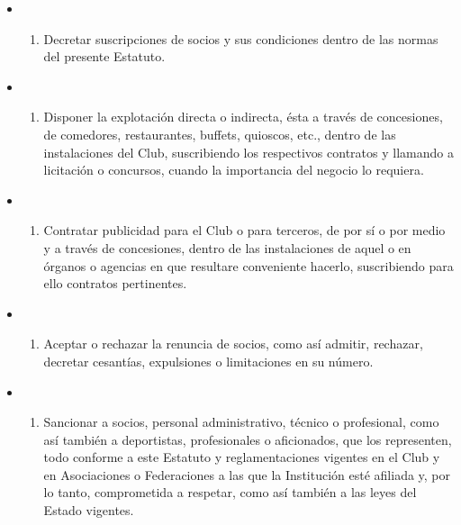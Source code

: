 \documentclass[]{book}
\providecommand{\tightlist}{%
  \setlength{\itemsep}{0pt}\setlength{\parskip}{0pt}}
\begin{document}
\begin{itemize}
\begin{itemize}
\begin{enumerate}
    \end{enumerate}
  \item
    \begin{enumerate}
    \def\labelenumi{\alph{enumi})}
    \setcounter{enumi}{14}
    \tightlist
    \item
      Decretar suscripciones de socios y sus condiciones dentro de las normas del presente Estatuto.
    \end{enumerate}
  \item
    \begin{enumerate}
    \def\labelenumi{\alph{enumi})}
    \setcounter{enumi}{15}
    \tightlist
    \item
      Disponer la explotación directa o indirecta, ésta a través de concesiones, de comedores, restaurantes, buffets, quioscos, etc., dentro de las instalaciones del Club, suscribiendo los respectivos contratos y llamando a licitación o concursos, cuando la importancia del negocio lo requiera.
    \end{enumerate}
  \item
    \begin{enumerate}
    \def\labelenumi{\alph{enumi})}
    \setcounter{enumi}{16}
    \tightlist
    \item
      Contratar publicidad para el Club o para terceros, de por sí o por medio y a través de concesiones, dentro de las instalaciones de aquel o en órganos o agencias en que resultare conveniente hacerlo, suscribiendo para ello contratos pertinentes.
    \end{enumerate}
  \item
    \begin{enumerate}
    \def\labelenumi{\alph{enumi})}
    \setcounter{enumi}{17}
    \tightlist
    \item
      Aceptar o rechazar la renuncia de socios, como así admitir, rechazar, decretar cesantías, expulsiones o limitaciones en su número.
    \end{enumerate}
  \item
    \begin{enumerate}
    \def\labelenumi{\alph{enumi})}
    \setcounter{enumi}{18}
    \tightlist
    \item
      Sancionar a socios, personal administrativo, técnico o profesional, como así también a deportistas, profesionales o aficionados, que los representen, todo conforme a este Estatuto y reglamentaciones vigentes en el Club y en Asociaciones o Federaciones a las que la Institución esté afiliada y, por lo tanto, comprometida a respetar, como así también a las leyes del Estado vigentes.

\end{enumerate}
\end{itemize}
\end{itemize}
\end{document}
